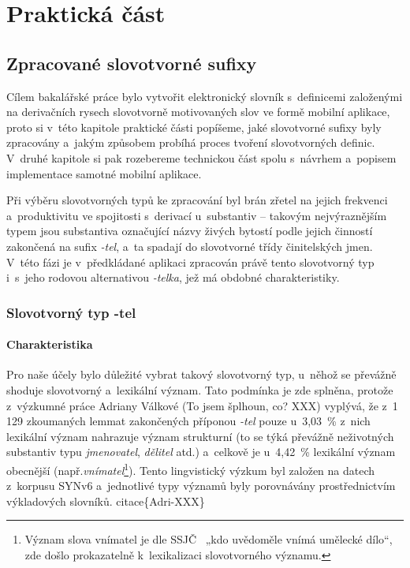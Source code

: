 \part{Praktická část}

\hypertarget{zpracovanuxe9-slovotvornuxe9-sufixy}{%
\chapter{Zpracované slovotvorné
sufixy}\label{zpracovanuxe9-slovotvornuxe9-sufixy}}

Cílem bakalářské práce bylo vytvořit elektronický slovník s~definicemi
založenými na derivačních rysech slovotvorně motivovaných slov ve formě
mobilní aplikace, proto si v~této kapitole praktické části popíšeme,
jaké slovotvorné sufixy byly zpracovány a~jakým způsobem probíhá proces
tvoření slovotvorných definic. V~druhé kapitole si pak rozebereme
technickou část spolu s~návrhem a~popisem implementace samotné mobilní
aplikace.

Při výběru slovotvorných typů ke zpracování byl brán zřetel na jejich
frekvenci a~produktivitu ve spojitosti s~derivací u~substantiv --
takovým nejvýraznějším typem jsou substantiva označující názvy živých
bytostí podle jejich činností zakončená na sufix \emph{-tel}, a~ta
spadají do slovotvorné třídy činitelských jmen.
\parencite[17]{dokulil67} V~této fázi je v~předkládané aplikaci
zpracován právě tento slovotvorný typ i~s~jeho rodovou alternativou
\emph{-telka}, jež má obdobné charakteristiky.

\hypertarget{slovotvornuxfd-typ--tel}{%
\section{Slovotvorný typ -tel}\label{slovotvornuxfd-typ--tel}}

\hypertarget{charakteristika}{%
\subsection{Charakteristika}\label{charakteristika}}

Pro naše účely bylo důležité vybrat takový slovotvorný typ, u~něhož se
převážně shoduje slovotvorný a~lexikální význam. Tato podmínka je zde
splněna, protože z~výzkumné práce Adriany Válkové (To jsem šplhoun, co?
XXX) vyplývá, že z~1 129 zkoumaných lemmat zakončených příponou
\emph{-tel} pouze u~3,03~\% z~nich lexikální význam nahrazuje význam
strukturní (to se týká převážně neživotných substantiv typu
\emph{jmenovatel}, \emph{dělitel} atd.) a~celkově je u~4,42~\% lexikální
význam obecnější
(např.\emph{vnímatel}\footnote{Význam slova vnímatel je dle SSJČ~\parencite{ssjc} „kdo uvědoměle vnímá umělecké dílo“, zde došlo prokazatelně k~lexikalizaci slovotvorného významu.}).
Tento lingvistický výzkum byl založen na datech z~korpusu SYNv6
a~jednotlivé typy významů byly porovnávány prostřednictvím výkladových
slovníků. citace\{Adri-XXX\}

